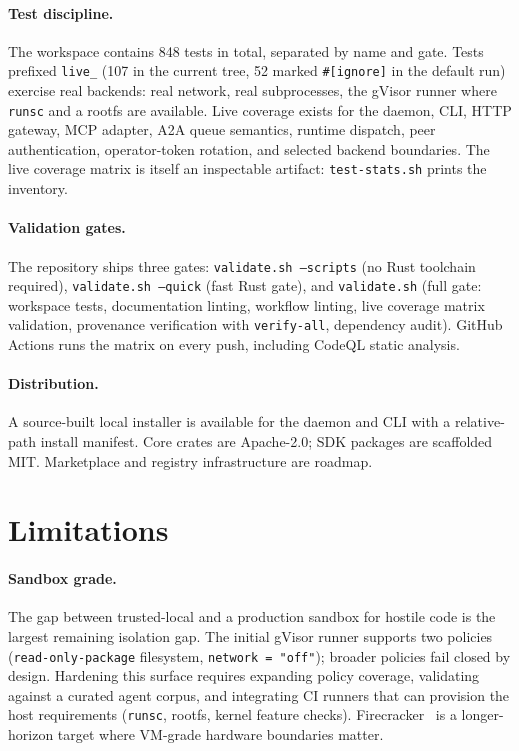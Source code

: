 \documentclass[11pt]{article}
\theoremstyle{plainsmall}
\begin{document}
\paragraph{Test discipline.} The workspace contains 848 tests in total, separated by name and gate. Tests prefixed \texttt{live\_} (107 in the current tree, 52 marked \texttt{\#[ignore]} in the default run) exercise real backends: real network, real subprocesses, the gVisor runner where \texttt{runsc} and a rootfs are available. Live coverage exists for the daemon, CLI, HTTP gateway, MCP adapter, A2A queue semantics, runtime dispatch, peer authentication, operator-token rotation, and selected backend boundaries. The live coverage matrix is itself an inspectable artifact: \texttt{test-stats.sh} prints the inventory.

\paragraph{Validation gates.} The repository ships three gates: \texttt{validate.sh --scripts} (no Rust toolchain required), \texttt{validate.sh --quick} (fast Rust gate), and \texttt{validate.sh} (full gate: workspace tests, documentation linting, workflow linting, live coverage matrix validation, provenance verification with \texttt{verify-all}, dependency audit). GitHub Actions runs the matrix on every push, including CodeQL static analysis.

\paragraph{Distribution.} A source-built local installer is available for the daemon and CLI with a relative-path install manifest. Core crates are Apache-2.0; SDK packages are scaffolded MIT. Marketplace and registry infrastructure are roadmap.

\section{Limitations}
\label{sec:limits}

\paragraph{Sandbox grade.} The gap between trusted-local and a production sandbox for hostile code is the largest remaining isolation gap. The initial gVisor runner supports two policies (\texttt{read-only-package} filesystem, \texttt{network = "off"}); broader policies fail closed by design. Hardening this surface requires expanding policy coverage, validating against a curated agent corpus, and integrating CI runners that can provision the host requirements (\texttt{runsc}, rootfs, kernel feature checks). Firecracker~\cite{firecracker} is a longer-horizon target where VM-grade hardware boundaries matter.
\end{document}
